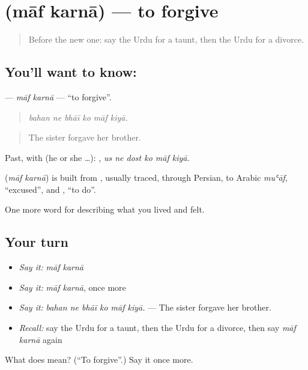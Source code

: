 \section[\texorpdfstring{\ur{معاف} \ur{کرنا} (māf karnā)}{معاف کرنا (māf karnā)}]{  (māf karnā) — to forgive}

\label{lesson:UR-C491-maf-karna}



\begin{quote}
Before the new one: say the Urdu for a taunt, then the Urdu for a divorce.
\end{quote}

\subsection*{You'll want to know:  }
\textbf{ } — \emph{māf karnā} — \textquotedblleft{}to forgive\textquotedblright{}.

\begin{quote}
     
\end{quote}

\begin{quote}
\emph{bahan ne bhāī ko māf kiyā.}
\end{quote}

\begin{quote}
The sister forgave her brother.
\end{quote}

Past, with  (he or she …):      , \emph{us ne dost ko māf kiyā}.

\begin{cousinweb}
\textbf{ } (\emph{māf karnā}) is built from \textbf{}, usually traced, through Persian, to Arabic \emph{muʿāf}, \textquotedblleft{}excused\textquotedblright{}, and \textbf{}, \textquotedblleft{}to do\textquotedblright{}.
\end{cousinweb}

\begin{grammarlens}[title={What you've built}]
One more word for describing what you lived and felt.
\end{grammarlens}

\subsection*{Your turn}
\begin{itemize}
\raggedright
  \item \emph{Say it:} \emph{māf karnā}
  \item \emph{Say it:} \emph{māf karnā}, once more
  \item \emph{Say it:} \emph{bahan ne bhāī ko māf kiyā.} — The sister forgave her brother.
  \item \emph{Recall:} say the Urdu for a taunt, then the Urdu for a divorce, then say \emph{māf karnā} again
\end{itemize}

\begin{tcolorbox}[breakable,colback=teal!4,colframe=teal!35!black,title={Before you move on}]
What does   mean? (\textquotedblleft{}To forgive\textquotedblright{}.) Say it once more.
\end{tcolorbox}
